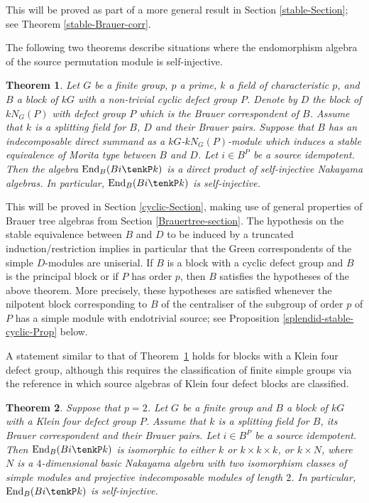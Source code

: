 \documentclass{amsart}
\theoremstyle{plain}\newtheorem{Theorem}{Theorem}[section]
\theoremstyle{plain}\newtheorem{Conjecture}[Theorem]{Conjecture}
\theoremstyle{plain}\newtheorem{Corollary}[Theorem]{Corollary}
\theoremstyle{plain}\newtheorem{Lemma}[Theorem]{Lemma}
\theoremstyle{plain}\newtheorem{Proposition}[Theorem]{Proposition}
\theoremstyle{definition}\newtheorem{Definition}[Theorem]{Definition}
\theoremstyle{definition}\newtheorem{Example}[Theorem]{Example}
\theoremstyle{definition}\newtheorem{Examples}[Theorem]{Examples}
\theoremstyle{definition}\newtheorem{Exercise}[Theorem]{Exercise}
\theoremstyle{definition}\newtheorem{Notation}[Theorem]{Notation}
\theoremstyle{definition}\newtheorem{Remark}[Theorem]{Remark}
\theoremstyle{definition}\newtheorem{Remarks}[Theorem]{Remarks}
\theoremstyle{plain}\newtheorem{Statement}[Theorem]{}
\def\End{\mathrm{End}}
\begin{document}
This will be proved as part of a more general result in Section \ref{stable-Section};
see Theorem \ref{stable-Brauer-corr}.
 
\medskip
The following  two   theorems    describe situations   where  the   endomorphism 
algebra  of the source permutation module  is self-injective.  


\begin{Theorem}\label{cyclic-thm}
Let $G$ be a finite group, $p$ a prime, $k$ a field of characteristic $p$,  and $B$ 
a block of $kG$ with a non-trivial cyclic defect group $P$.  
Denote by $D$ the block of $kN_G(P)$ with defect group $P$  which is the Brauer 
correspondent of $B$. Assume that $k$ is a splitting field for $B$, $D$ and their
Brauer pairs. Suppose that $B$ has an indecomposable direct summand as a 
$kG$-$kN_G(P)$-module which  induces a stable equivalence of Morita type 
between $B$ and  $D$. Let $i\in B^P$ be a source idempotent. Then the algebra
$\End_{B}(Bi\tenkP k)$ is a direct product of  self-injective Nakayama algebras. 
In particular,  $\End_{B}(Bi\tenkP k)$ is self-injective.
\end{Theorem}

This will be proved in Section \ref{cyclic-Section}, making use of general properties
of Brauer tree algebras from Section \ref{Brauertree-section}.
The hypothesis on the stable equivalence between $B$ and $D$ to be induced
by a truncated induction/restriction implies in particular that the Green 
correspondents of the simple $D$-modules are uniserial.
If $B$ is a block with a cyclic defect group and $B$  is the principal  block   
or if  $P$ has order $p$, then $B$  satisfies the hypotheses of the above theorem.   
More precisely, these hypotheses are satisfied whenever the nilpotent block 
corresponding to $B$  of the centraliser of the subgroup of 
order $p$ of $P$  has a simple module with endotrivial source; see Proposition
\ref{splendid-stable-cyclic-Prop} below.

\medskip
A  statement similar  to  that of Theorem~\ref{cyclic-thm}  holds for blocks with a 
Klein four defect group, although
this requires the classification of finite simple groups via the reference
\cite{CEKL} in which source algebras of Klein four defect blocks are classified.

\begin{Theorem} \label{Kleinfour-thm}
Suppose that $p=2$. Let $G$ be a finite group and $B$ a block of $kG$
with a Klein four defect group $P$. Assume that $k$ is a splitting field for
$B$, its Brauer correspondent and their Brauer pairs.
Let $i\in B^P$ be a source idempotent.
Then $\End_B(Bi\tenkP k)$ is isomorphic to either $k$ or $k\times k\times k$, or
$k\times N$, where $N$ is a $4$-dimensional basic Nakayama algebra with two 
isomorphism classes of simple modules and  projective indecomposable modules 
of length $2$. In particular, $\End_B(Bi\tenkP k)$ is self-injective.
\end{Theorem} 
\end{document}
